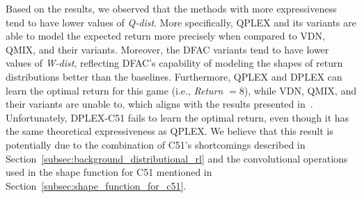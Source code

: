\documentclass[twoside,11pt]{article}
\begin{document}
Based on the results, we observed that the methods with more expressiveness tend to have lower values of \textit{Q-dist}. More specifically, QPLEX and its variants are able to model the expected return more precisely when compared to VDN, QMIX, and their variants.
Moreover, the DFAC variants tend to have lower values of \textit{W-dist}, reflecting DFAC's capability of modeling the shapes of return distributions better than the baselines.
Furthermore, QPLEX and DPLEX can learn the optimal return for this game (i.e., \textit{Return} $=8$), while VDN, QMIX, and their variants are unable to, which aligns with the results presented in~\cite{Wang2020QPLEX}.
Unfortunately, DPLEX-C51 fails to learn the optimal return, even though it has the same theoretical expressiveness as QPLEX. We believe that this result is potentially due to the combination of C51's shortcomings described in Section~\ref{subsec:background_distributional_rl} and the convolutional operations used in the shape function for C51 mentioned in Section~\ref{subsec:shape_function_for_c51}.
\end{document}
